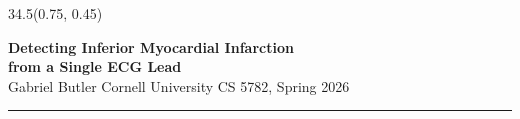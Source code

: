 \documentclass[final]{article}
\newcommand{\titlefs}{\fontsize{68}{80}\selectfont}
\newcommand{\authorfs}{\fontsize{28}{34}\selectfont}
\newcommand{\bodyfs}{\fontsize{21}{26}\selectfont}
\begin{document}
\null %

\begin{textblock}{34.5}(0.75, 0.45)
\bodyfs\RaggedRight
\begin{center}
{\titlefs\bfseries\color{darkink}Detecting Inferior Myocardial Infarction\\from a Single ECG Lead}\\[0.15em]
{\authorfs\color{bodyink}Gabriel Butler \;\textperiodcentered\; Cornell University \;\textperiodcentered\; CS 5782, Spring 2026}
\end{center}
\vspace{0.12in}
\textcolor{cornellred}{\rule{\linewidth}{4pt}}
\end{textblock}
\end{document}
